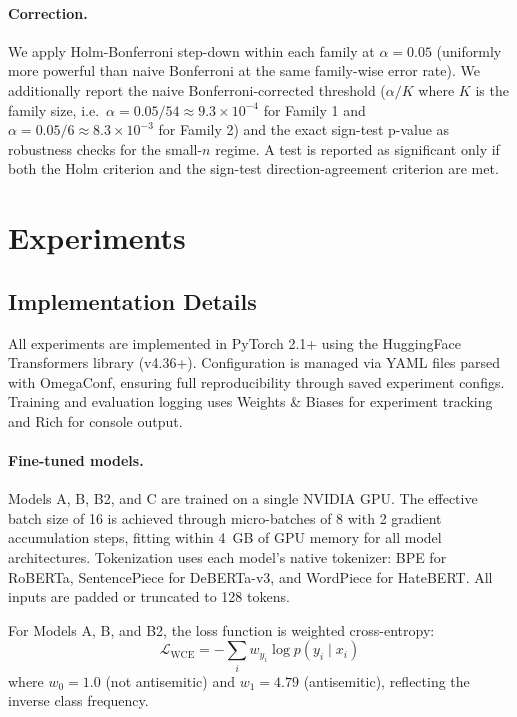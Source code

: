 \documentclass[10pt,a4paper]{article}
\begin{document}
\paragraph{Correction.}
We apply Holm-Bonferroni step-down within each family at $\alpha = 0.05$ (uniformly more powerful than naive Bonferroni at the same family-wise error rate). We additionally report the naive Bonferroni-corrected threshold ($\alpha / K$ where $K$ is the family size, i.e.\ $\alpha = 0.05/54 \approx 9.3 \times 10^{-4}$ for Family 1 and $\alpha = 0.05/6 \approx 8.3 \times 10^{-3}$ for Family 2) and the exact sign-test p-value as robustness checks for the small-$n$ regime. A test is reported as significant only if both the Holm criterion and the sign-test direction-agreement criterion are met.


\section{Experiments}
\label{sec:experiments}

\subsection{Implementation Details}

All experiments are implemented in PyTorch 2.1+ using the HuggingFace Transformers library (v4.36+). Configuration is managed via YAML files parsed with OmegaConf, ensuring full reproducibility through saved experiment configs. Training and evaluation logging uses Weights \& Biases for experiment tracking and Rich for console output.

\paragraph{Fine-tuned models.}
Models A, B, B2, and C are trained on a single NVIDIA GPU. The effective batch size of 16 is achieved through micro-batches of 8 with 2 gradient accumulation steps, fitting within 4~GB of GPU memory for all model architectures. Tokenization uses each model's native tokenizer: BPE for RoBERTa, SentencePiece for DeBERTa-v3, and WordPiece for HateBERT. All inputs are padded or truncated to 128 tokens.

For Models A, B, and B2, the loss function is weighted cross-entropy:
\begin{equation}
    \mathcal{L}_{\text{WCE}} = -\sum_{i} w_{y_i} \log p(y_i \mid x_i)
\end{equation}
where $w_0 = 1.0$ (not antisemitic) and $w_1 = 4.79$ (antisemitic), reflecting the inverse class frequency.
\end{document}
